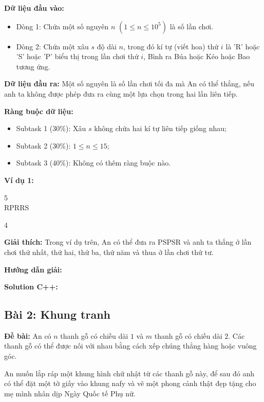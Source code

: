 \documentclass[12pt]{scrartcl}  %
\begin{document}
\textbf{Dữ liệu đầu vào:}
\begin{itemize}
    \item Dòng 1: Chứa một số nguyên $n$ $(1 \leq n \leq 10^5)$ là số lần chơi.
    \item Dòng 2: Chứa một xâu $s$ độ dài $n$, trong đó kí tự (viết hoa) thứ $i$ là 'R' hoặc 'S' hoặc 'P' biểu thị trong lần chơi
thứ $i$, Bình ra Búa hoặc Kéo hoặc Bao tương ứng.
\end{itemize}

\textbf{Dữ liệu đầu ra:}
Một số nguyên là số lần chơi tối đa mà An có thể thắng, nếu anh ta không được phép đưa ra cùng một lựa chọn trong hai lần liên tiếp.

\textbf{Ràng buộc dữ liệu:}
\begin{itemize}
    \item Subtask 1 (30\%): Xâu $s$ không chứa hai kí tự liên tiếp giống nhau;
    \item Subtask 2 (30\%): $1 \leq n \leq 15$;
    \item Subtask 3 (40\%): Không có thêm ràng buộc nào.
\end{itemize}

\textbf{Ví dụ 1:}
\begin{tcolorbox}[colback=gray!5!white, colframe=blue!50!black, title=Input]
5\\
RPRRS
\end{tcolorbox}
\begin{tcolorbox}[colback=gray!5!white, colframe=green!50!black, title=Output]
4
\end{tcolorbox}

\textbf{Giải thích:}
Trong ví dụ trên, An có thể đưa ra PSPSR và anh ta thắng ở lần chơi thứ nhất, thứ hai, thứ ba, thứ năm và thua ở lần chơi thứ tư.

\textbf{Hướng dẫn giải:}

\textbf{Solution C++:}

\subsection{Bài 2: Khung tranh}
\textbf{Đề bài:}
An có $n$ thanh gỗ có chiều dài $1$ và $m$ thanh gỗ có chiều dài $2$. Các thanh gỗ có thể được nối với nhau bằng cách xếp chúng thẳng hàng hoặc vuông góc.

An muốn lắp ráp một khung hình chữ nhật từ các thanh gỗ này, để sau đó anh có thể đặt một tờ giấy vào khung nafy và vẽ một phong cảnh thật đẹp tặng cho mẹ mình nhân dịp Ngày Quốc tế Phụ nữ.
\end{document}
